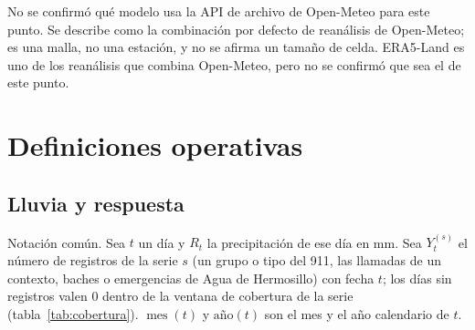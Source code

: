 \documentclass[11pt]{article}
\begin{document}
No se confirmó qué modelo usa la API de archivo de Open-Meteo para este punto. Se describe como la combinación por defecto de reanálisis de Open-Meteo; es una malla, no una estación, y no se afirma un tamaño de celda. ERA5-Land \cite{munozsabater2021} es uno de los reanálisis que combina Open-Meteo, pero no se confirmó que sea el de este punto.

\section{Definiciones operativas}
\label{sec:defs}

\subsection{Lluvia y respuesta}

Notación común. Sea $t$ un día y $R_t$ la precipitación de ese día en mm. Sea $Y^{(s)}_t$ el número de registros de la serie $s$ (un grupo o tipo del 911, las llamadas de un contexto, baches o emergencias de Agua de Hermosillo) con fecha $t$; los días sin registros valen 0 dentro de la ventana de cobertura de la serie (tabla~\ref{tab:cobertura}). $\operatorname{mes}(t)$ y $\text{año}(t)$ son el mes y el año calendario de $t$.
\end{document}
